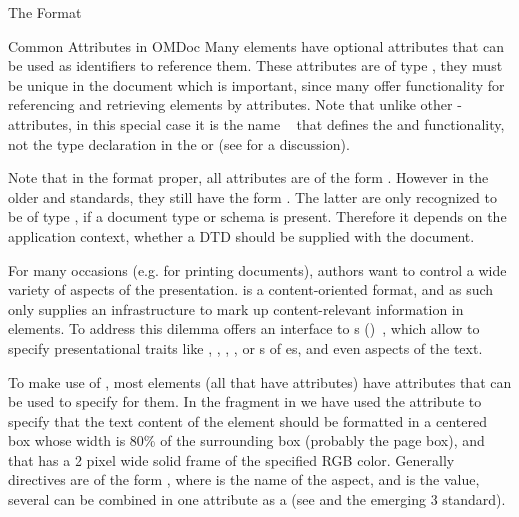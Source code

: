 \begin{omgroup}[creators=miko,id=spec-intro]{The \omdoc Format}
\begin{omgroup}[id=common-attribs]{Common Attributes in OMDoc}
Many \omdoc elements have optional {} attributes that
can be used as identifiers to reference them. These attributes are of type
, they must be unique in the document which is important,
since many {\xml}  offer functionality for
referencing and retrieving elements by  attributes.
Note that unlike other {}-attributes, in this special case it is the name
{}~\cite{XML:id05} that defines the
{} and {} functionality, not the type
declaration in the {} or {} (see
{} for a discussion).

  Note that in the \omdoc format proper, all {} attributes are of the
  form {}. However in the older {\openmath} and {\mathml}
  standards, they still have the form {}. The latter are only
  recognized to be of type {}, if a document type or {\xml}schema is
  present. Therefore it depends on the application context, whether a DTD should be
  supplied with the \omdoc document.

  For many occasions (e.g. for printing \omdoc documents), authors want to control a
  wide variety of aspects of the presentation. \omdoc is a content-oriented format, and
  as such only supplies an infrastructure to mark up content-relevant information in
  \omdoc elements. To address this dilemma {\xml} offers an interface to 
  {s} ({\css})~\cite{BosHak:css98}, which allow to specify
  presentational traits like {}, {},
  {}, {}, or {s} of
  {es}, and even {} aspects of the text.

  To make use of {\css}, most \omdoc elements (all that have
  {} attributes) have {} attributes
  that can be used to specify {\css}  for them. In the
  \omdoc fragment in {} we have used the 
  attribute to specify that the text content of the  element should be
  formatted in a centered box whose width is 80\% of the surrounding box (probably the
  page box), and that has a 2 pixel wide solid frame of the specified RGB color. Generally
  {\css} directives are of the form {}, where {} is the name of
  the aspect, and {} is the value, several {\css}
   can be combined in one {}
  attribute as a {} (see {\cite{BosHak:css98} and the
    emerging {\css} 3} standard).


\end{omgroup}
\end{omgroup}
